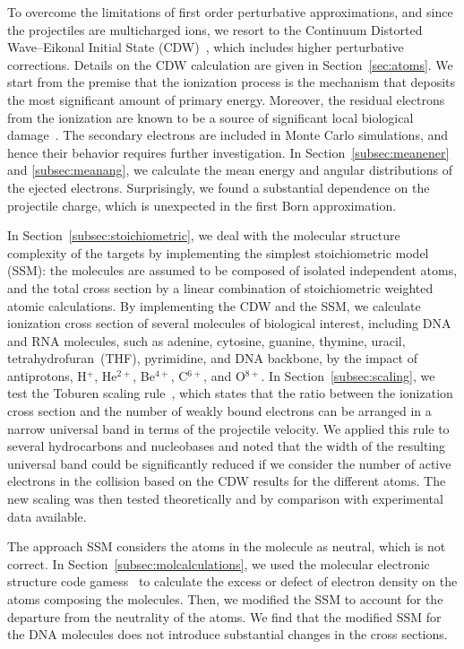 \documentclass[10pt,showpacs,showkeys,twocolumn]{revtex4}
\begin{document}
To overcome the limitations of first order perturbative approximations, 
and since the projectiles are multicharged ions, we resort to the 
Continuum Distorted Wave--Eikonal Initial State 
(CDW)~\cite{galassi2000,fainstein1988,miraglia2008,miraglia2009}, which 
includes higher perturbative corrections. Details on the CDW calculation 
are given in Section~\ref{sec:atoms}.
We start from the premise that the ionization 
process is the mechanism that deposits the most significant amount of 
primary energy. Moreover, the residual electrons from the ionization 
are known to be a source of significant local biological damage~\cite{Denifl2011}. 
The secondary electrons are included in Monte Carlo simulations, 
and hence their behavior requires further investigation.
In Section~\ref{subsec:meanener} and \ref{subsec:meanang}, we calculate
the mean energy and angular distributions of the ejected electrons. 
Surprisingly, we found a substantial dependence on the projectile charge, 
which is unexpected in the first Born approximation. 

In Section~\ref{subsec:stoichiometric}, we deal with the molecular 
structure complexity of the targets by 
implementing the simplest stoichiometric model (SSM): the molecules are 
assumed to be composed of isolated independent atoms, and the total 
cross section by a linear combination of stoichiometric weighted atomic 
calculations.
By implementing the CDW and the SSM, we calculate ionization 
cross section of several molecules of biological interest, including 
DNA and RNA molecules, such as adenine, cytosine, guanine, thymine, uracil, 
tetrahydrofuran~(THF), pyrimidine, and DNA backbone, by the impact 
of antiprotons, H$^{+}$, He$^{2+}$, Be$^{4+}$, C$^{6+}$, and O$^{8+}$. 
In Section~\ref{subsec:scaling}, we
test the Toburen scaling rule~\cite{toburen1975,toburen1976}, which 
states that the ratio between the ionization cross section and the 
number of weakly bound electrons can be arranged in a narrow universal 
band in terms of the projectile velocity. We applied this rule to 
several hydrocarbons and nucleobases and noted that the width of the 
resulting universal band could be significantly reduced if we consider 
the number of active electrons in the collision based on the 
CDW results for the different atoms. The new scaling was then tested 
theoretically and by comparison with experimental data available.

The approach SSM considers the atoms in the molecule as neutral, 
which is not correct. In Section~\ref{subsec:molcalculations}, 
we used the molecular electronic structure code 
{\sc gamess}~\cite{gamess} to calculate the excess or defect of 
electron density on the atoms composing the molecules. Then, we modified 
the SSM to account for the departure from the neutrality of the atoms. 
We find that the modified SSM for the DNA molecules does not introduce 
substantial changes in the cross sections.
\end{document}

